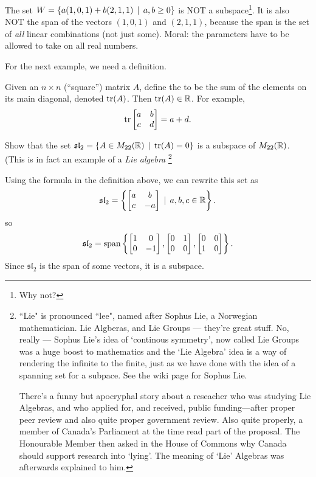 \begin{myexample} The set $W = \{ a(1,0,1) + b(2,1,1) \,\mid \, a,b \geq 0\}$ is NOT
a subspace\footnote{Why not?}.  It is also NOT the span of the vectors $(1,0,1)$ and
$(2,1,1)$, because the span is the set of \emph{all} linear combinations
(not just some).  Moral: the parameters have to be allowed to take
on all real numbers.
\end{myexample}


For the next example, we need a definition.


\begin{definition}
Given an $n \times n$ (``square'') matrix $A$, define the 
to be the sum of the elements on its main diagonal, denoted $\operatorname{tr}(A)$. Then
$\operatorname{tr}(A) \in \mathbb{R}$.  
For example,
$$
\operatorname{tr}\left[ \begin{matrix} a & b\\ c& d \end{matrix} \right] = a + d.
$$
\end{definition}

\begin{myprob} Show that the set $\mathfrak{sl}_2 = \{ A \in M_{22}(\mathbb{R}) \,\mid \, \operatorname{tr}(A) = 0\}$
is a subspace of $M_{22}(\mathbb{R})$.  (This is in fact an example of a \emph{Lie algebra} \footnote{``Lie" is pronounced ``lee", named after Sophus Lie, a Norwegian mathematician. Lie Algberas, and Lie Groups  --- they're great stuff. No, really --- Sophus Lie's  idea of `continous symmetry', now called Lie Groups was a huge boost to mathematics and the `Lie Algebra' idea is a way of rendering the infinite to the finite, just as we have done with the idea of a spanning set for a subpace. See the wiki page for Sophus Lie. 


There's a funny but apocryphal story about a reseacher who was studying Lie Algebras, and  who applied  for, and received, public funding---after proper peer review and also quite proper government review. Also quite properly, a member of Canada's Parliament at the time read part of the proposal. The Honourable Member then asked in the House of Commons  why Canada should support research into `lying'. The meaning of  `Lie' Algebras was afterwards explained to him. }  

\begin{mysol} Using the formula in the definition above, we can rewrite this
set as
$$
\mathfrak{sl}_2 = \left\{ \left[ \begin{matrix} a & b \\ c & -a \end{matrix} \right] \,\mid \, a,b,c\in \mathbb{R}\right\}.
$$
so 
$$
\mathfrak{sl}_2 = \textrm{span}\left\{ \left[ \begin{matrix} 1&0\\0&-1 \end{matrix} \right], \left[ \begin{matrix} 0&1\\0&0 \end{matrix} \right], \left[ \begin{matrix} 0&0\\1&0 \end{matrix} \right]\right\}.
$$
Since $\mathfrak{sl}_2$ is the span of some vectors, it is a subspace.
\end{mysol}\end{myprob}


